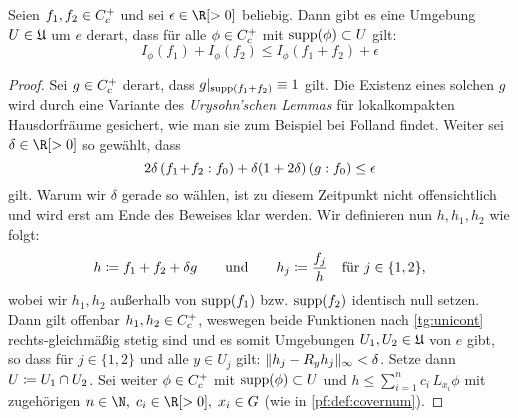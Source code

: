 \begin{thLemma}
    \label{pf:approxadditive}
    Seien $f_1,f_2 \in C_c^+$ und sei $\epsilon\in\R[>0]$ beliebig.
    Dann gibt es eine Umgebung $U\in\mathfrak{U}$ um $e$ derart, dass für alle
    $\phi\in C_c^+$ mit $\operatorname{supp}(\phi)\subset U$ gilt:
    \[ I_\phi(f_1) + I_\phi(f_2) \leq I_\phi(f_1+f_2) + \epsilon  \]
\end{thLemma}

\begin{proof}
    Sei $g\in C_c^+$ derart, dass $g\vert_{\operatorname{supp}(f_1+f_2)} \equiv 1$
    gilt. Die Existenz eines solchen $g$ wird durch eine Variante des
    \emph{Urysohn'schen Lemmas} für lokalkompakten Hausdorfräume gesichert,
    wie man sie zum Beispiel bei Folland\cite[\S4,]{bookc:folland99} 
    findet. Weiter sei $\delta\in\R[>0]$ so gewählt, dass
    \[ 2\delta\, (f_1\mkern1mu{+}\mkern1mu f_2 : f_0) 
        + \delta(1+2\delta) \, (g : f_0) \leq \epsilon
    \]
    gilt. Warum wir $\delta$ gerade so wählen, ist zu diesem Zeitpunkt nicht
    offensichtlich und wird erst am Ende des Beweises klar werden.
    Wir definieren nun $h,h_1,h_2$ wie folgt:
    \[ h \coloneqq f_1+f_2+\delta g \qquad\text{und}\qquad
        h_j \coloneqq \frac{f_j}{h} \quad \text{für $j\in\{1,2\}$,}
    \]
    wobei wir $h_1,h_2$ außerhalb von $\operatorname{supp}(f_1)$ bzw. $\operatorname{supp}(f_2)$ identisch
    null setzen. Dann gilt offenbar $h_1,h_2\in C_c^+$, weswegen beide
    Funktionen nach \cref{tg:unicont} rechts-gleichmäßig stetig sind und es somit
    Umgebungen $U_1,U_2\in\mathfrak{U}$ von $e$ gibt, so dass für $j\in\{1,2\}$ und
    alle $y\in U_j$ gilt: $\lVert h_j - R_yh_j\rVert_\infty < \delta$. Setze dann $U\coloneqq
    U_1\cap U_2$. Sei weiter $\phi\in C_c^+$ mit $\operatorname{supp}(\phi)\subset U$ und 
    $h\leq \sum_{i=1}^n c_i\,L_{x_i}\phi$ mit zugehörigen
    $n\in\N,\;c_i\in\R[>0],\; x_i\in G$ (wie in \cref{pf:def:covernum}).
    

\end{proof}
